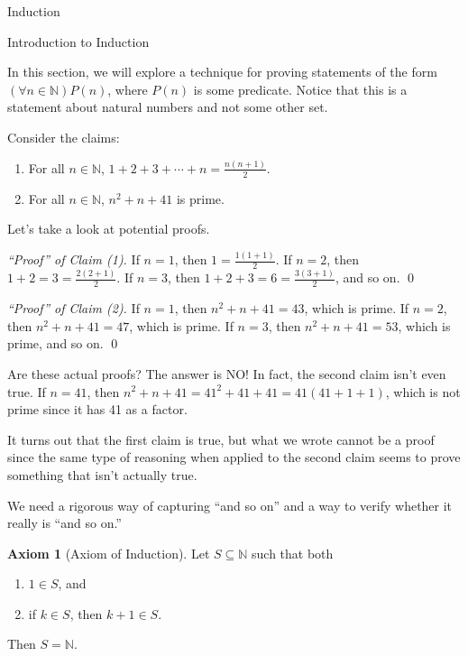 \documentclass[11pt]{article}
\theoremstyle{definition}
\newtheorem{axiom}[theorem]{Axiom}
\begin{document}
\addtocounter{section}{2}

\begin{section}{Induction}

\begin{subsection}{Introduction to Induction}

In this section, we will explore a technique for proving statements of the form $(\forall n \in \mathbb{N})P(n)$, where $P(n)$ is some predicate.  Notice that this is a statement about natural numbers and not some other set.

Consider the claims:
\begin{enumerate}
\item For all $n\in\mathbb{N}$, $\displaystyle 1+2+3+\cdots +n=\frac{n(n+1)}{2}$.
\item For all $n\in\mathbb{N}$, $n^{2}+n+41$ is prime.
\end{enumerate}
Let's take a look at potential proofs.

\bigskip

\noindent \emph{``Proof'' of Claim (1).} If $n=1$, then $1=\frac{1(1+1)}{2}$.  If $n=2$, then $1+2=3=\frac{2(2+1)}{2}$.  If $n=3$, then $1+2+3=6=\frac{3(3+1)}{2}$, and so on. \hfill \qed

\bigskip

\noindent \emph{``Proof'' of Claim (2).} If $n=1$, then $n^{2}+n+41=43$, which is prime.  If $n=2$, then $n^{2}+n+41=47$, which is prime.  If $n=3$, then $n^{2}+n+41=53$, which is prime, and so on. \hfill \qed

\bigskip

Are these actual proofs?  The answer is NO!  In fact, the second claim isn't even true.  If $n=41$, then $n^{2}+n+41=41^{2}+41+41=41(41+1+1)$, which is not prime since it has 41 as a factor.

It turns out that the first claim is true, but what we wrote cannot be a proof since the same type of reasoning when applied to the second claim seems to prove something that isn't actually true.

We need a rigorous way of capturing ``and so on'' and a way to verify whether it really is ``and so on.''

\begin{axiom}[Axiom of Induction]
Let $S\subseteq \mathbb{N}$ such that both
\begin{enumerate}
\item $1\in S$, and
\item if $k\in S$, then $k+1\in S$.
\end{enumerate}
Then $S=\mathbb{N}$.
\end{axiom}


\end{subsection}
\end{section}
\end{document}
